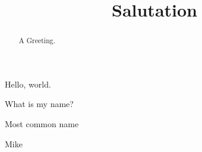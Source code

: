 \documentclass{ximera}
\title[Salutation]{Salutation}
\begin{document}
\begin{abstract}
A Greeting.
\end{abstract}
\maketitle
Hello, world.

\begin{question}
What is my name?
\begin{hint}
Most common name
\end{hint}
\begin{freeResponse}
Mike
\end{freeResponse}
\end{question}
\end{document}

